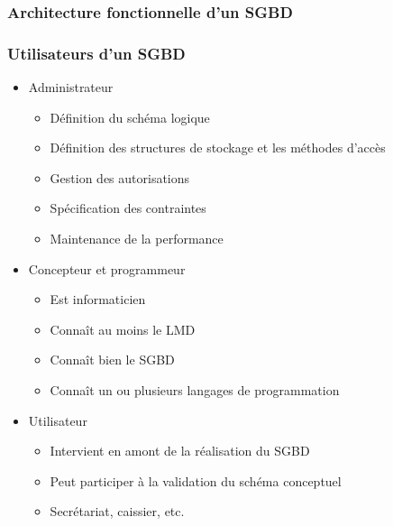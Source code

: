 \begin{frame}
  \frametitle{Architecture fonctionnelle d'un SGBD}
  \begin{center}
  \end{center}
\end{frame}

\begin{frame}
  \frametitle{Utilisateurs d'un SGBD}
  \begin{itemize}
    \item Administrateur
      \begin{itemize}
        \item Définition du schéma logique
        \item Définition des structures de stockage et les méthodes d'accès
        \item Gestion des autorisations
        \item Spécification des contraintes
        \item Maintenance de la performance
      \end{itemize}
    \item Concepteur et programmeur
      \begin{itemize}
        \item Est informaticien
        \item Connaît au moins le LMD
        \item Connaît bien le SGBD
        \item Connaît un ou plusieurs langages de programmation
      \end{itemize}
    \item Utilisateur
      \begin{itemize}
        \item Intervient en amont de la réalisation du SGBD
        \item Peut participer à la validation du schéma conceptuel
        \item Secrétariat, caissier, etc.
      \end{itemize}
  \end{itemize}
\end{frame}

